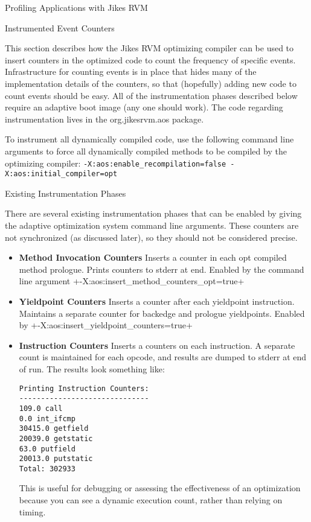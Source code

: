 \begin{section}{Profiling Applications with Jikes RVM}
\begin{subsection}{Instrumented Event Counters}

This section describes how the Jikes RVM optimizing compiler can be used to insert counters in the optimized code to count the frequency of specific events. Infrastructure for counting events is in place that hides many of the implementation details of the counters, so that (hopefully) adding new code to count events should be easy. All of the instrumentation phases described below require an adaptive boot image (any one should work). The code regarding instrumentation lives in the org.jikesrvm.aos package.

To instrument all dynamically compiled code, use the following command line arguments to force all dynamically compiled methods to be compiled by the optimizing compiler: \texttt{-X:aos:enable\_recompilation=false -X:aos:initial\_compiler=opt}

\begin{subsubsection}{Existing Instrumentation Phases}

There are several existing instrumentation phases that can be enabled by giving the adaptive optimization system command line arguments. These counters are not synchronized (as discussed later), so they should not be considered precise.

\begin{itemize}
  \item \textbf{Method Invocation Counters} Inserts a counter in each opt compiled method prologue. Prints counters to stderr at end. Enabled by the command line argument \spverb+-X:aos:insert_method_counters_opt=true+
  \item \textbf{Yieldpoint Counters} Inserts a counter after each yieldpoint instruction. Maintains a separate counter for backedge and prologue yieldpoints. Enabled by \spverb+-X:aos:insert_yieldpoint_counters=true+
  \item \textbf{Instruction Counters} Inserts a counters on each instruction. A separate count is maintained for each opcode, and results are dumped to stderr at end of run. The results look something like:
    \begin{lstlisting}
Printing Instruction Counters:
------------------------------
109.0 call
0.0 int_ifcmp
30415.0 getfield
20039.0 getstatic
63.0 putfield
20013.0 putstatic
Total: 302933
    \end{lstlisting}
    This is useful for debugging or assessing the effectiveness of an optimization because you can see a dynamic execution count, rather than relying on timing.


\end{itemize}
\end{subsubsection}
\end{subsection}
\end{section}
